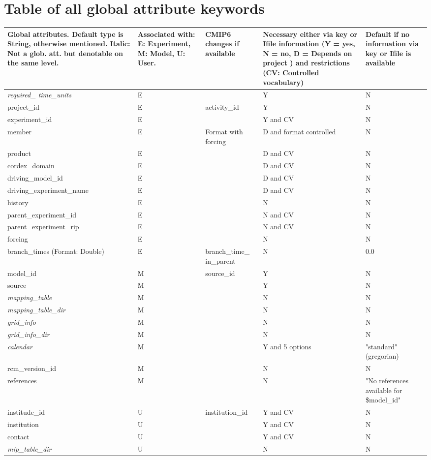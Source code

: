 \chapter{Table of all global attribute keywords}
\label{chap:AllKeys}
\begin{tabular}{|p{4cm}|p{2cm}|p{2cm}|p{3.2cm}|p{2.3cm}|}
\hline  
\textbf{Global attributes.} Default type is String, otherwise mentioned. Italic: Not a glob. att. but denotable on the same level. & \textbf{Associated with:
E: Experiment, M: Model, U: User.} & \textbf{CMIP6 changes if available} & \textbf{Necessary either via key or Ifile information (Y = yes, N = no, D = Depends on project ) and restrictions (CV: Controlled vocabulary)} & \textbf{Default if no information via key or Ifile is available} \\
\hline
\textit{required\_
time\_units} & E &  & Y & N \\
\hline
project\_id & E & activity\_id & Y & N \\
\hline 
experiment\_id & E &  & Y and CV & N \\
\hline 
member & E & Format with forcing & D and format controlled & N \\
\hline 
product & E &  & D and CV & N \\
\hline 
cordex\_domain & E & & D and CV & N \\
\hline 
driving\_model\_id & E & & D and CV & N \\
\hline 
driving\_experiment\_name & E & & D and CV & N \\
\hline 
history & E & & N & N \\
\hline 
parent\_experiment\_id & E & & N and CV & N \\
\hline 
parent\_experiment\_rip & E & & N and CV & N \\
\hline 
forcing & E & & N & N \\
\hline 
branch\_times (Format: Double) & E & branch\_time\_
in\_parent& N & 0.0 \\
\hline 
\hline 
model\_id & M & source\_id & Y & N \\
\hline
source & M & & Y & N \\
\hline
\textit{mapping\_table} & M & & N & N \\
\hline
\textit{mapping\_table\_dir} & M & & N & N  \\
\hline
\textit{grid\_info} & M & & N & N \\
\hline
\textit{grid\_info\_dir} & M & & N & N  \\
\hline
\textit{calendar} & M & & Y and 5 options & "standard" (gregorian) \\
\hline
rcm\_version\_id & M & & N & N  \\
\hline
references & M & & N & "No references available for \$model\_id"  \\
\hline
\hline
institude\_id & U & institution\_id & Y and CV & N  \\
\hline
institution & U & & Y and CV & N  \\
\hline
contact & U & & Y and CV & N  \\
\hline
\textit{mip\_table\_dir} & U & & N & N  \\
\hline
\end{tabular} 

